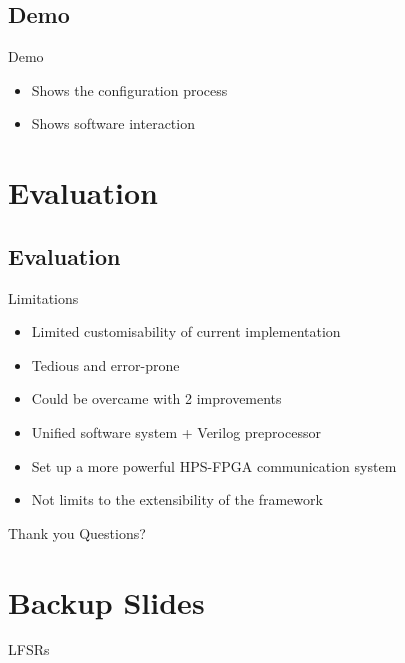 \documentclass[t]{beamer}
\begin{document}
\subsection{Demo}
\begin{frame}{Demo}
  \begin{itemize}
    \item Shows the configuration process
    \item Shows software interaction
  \end{itemize}
\end{frame}

\section{Evaluation}
\subsection{Evaluation}
\begin{frame}{Limitations}
\begin{itemize}
  \item Limited customisability of current implementation
  \item Tedious and error-prone 
  \item Could be overcame with 2 improvements
  \item Unified software system + Verilog preprocessor
  \item Set up a more powerful HPS-FPGA communication system
  \item Not limits to the extensibility of the framework
\end{itemize}
\end{frame}

\begin{frame}{Thank you}
  Questions?
\end{frame}

\section{Backup Slides}
\begin{frame}{LFSRs}
  \begin{figure}[H]
    \centering
    
  \end{figure}
  \begin{figure}[H]
    \centering
    
  \end{figure}
\end{frame}
\end{document}

